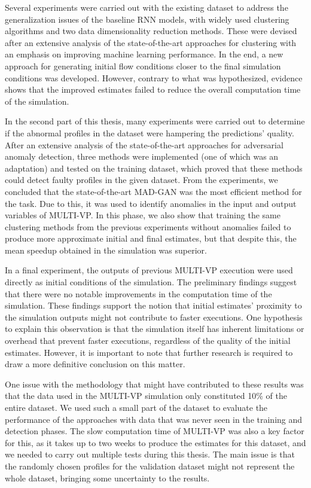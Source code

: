 Several experiments were carried out with the existing dataset to address the generalization issues of the baseline RNN models, with widely used clustering algorithms and two data dimensionality reduction methods. These were devised after an extensive analysis of the state-of-the-art approaches for clustering with an emphasis on improving machine learning performance. In the end, a new approach for generating initial flow conditions closer to the final simulation conditions was developed. However, contrary to what was hypothesized, evidence shows that the improved estimates failed to reduce the overall computation time of the simulation. 

In the second part of this thesis, many experiments were carried out to determine if the abnormal profiles in the dataset were hampering the predictions' quality. After an extensive analysis of the state-of-the-art approaches for adversarial anomaly detection, three methods were implemented (one of which was an adaptation) and tested on the training dataset, which proved that these methods could detect faulty profiles in the given dataset. From the experiments, we concluded that the state-of-the-art MAD-GAN was the most efficient method for the task. Due to this, it was used to identify anomalies in the input and output variables of MULTI-VP. In this phase, we also show that training the same clustering methods from the previous experiments without anomalies failed to produce more approximate initial and final estimates, but that despite this, the mean speedup obtained in the simulation was superior. 

In a final experiment, the outputs of previous MULTI-VP execution were used directly as initial conditions of the simulation. The preliminary findings suggest that there were no notable improvements in the computation time of the simulation. These findings support the notion that initial estimates' proximity to the simulation outputs might not contribute to faster executions. One hypothesis to explain this observation is that the simulation itself has inherent limitations or overhead that prevent faster executions, regardless of the quality of the initial estimates. However, it is important to note that further research is required to draw a more definitive conclusion on this matter.

One issue with the methodology that might have contributed to these results was that the data used in the MULTI-VP simulation only constituted 10\% of the entire dataset. We used such a small part of the dataset to evaluate the performance of the approaches with data that was never seen in the training and detection phases. The slow computation time of MULTI-VP was also a key factor for this, as it takes up to two weeks to produce the estimates for this dataset, and we needed to carry out multiple tests during this thesis. The main issue is that the randomly chosen profiles for the validation dataset might not represent the whole dataset, bringing some uncertainty to the results. 

